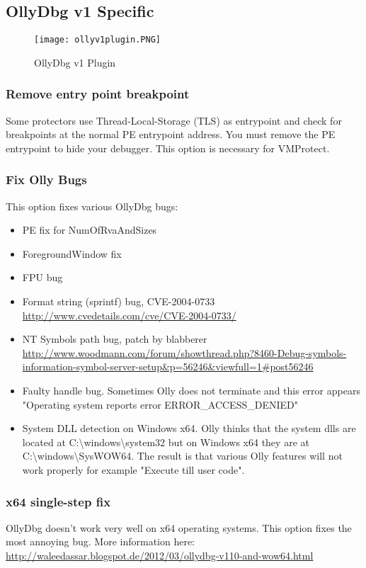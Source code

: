 \documentclass[10pt,a4paper]{article}
\begin{document}
\subsection{OllyDbg v1 Specific}

\begin{figure}[H]
\centering
\texttt{[image: ollyv1plugin.PNG]}
\caption{OllyDbg v1 Plugin}
\end{figure}

\subsubsection{Remove entry point breakpoint}
Some protectors use Thread-Local-Storage (TLS) as entrypoint and check for breakpoints at the normal PE entrypoint address. You must remove the PE entrypoint to hide your debugger. This option is necessary for VMProtect.

\pagebreak

\subsubsection{Fix Olly Bugs}
This option fixes various OllyDbg bugs: 
\begin{itemize}
\item PE fix for NumOfRvaAndSizes
\item ForegroundWindow fix
\item FPU bug
\item Format string (sprintf) bug, CVE-2004-0733 \url{http://www.cvedetails.com/cve/CVE-2004-0733/}
\item NT Symbols path bug, patch by blabberer \url{http://www.woodmann.com/forum/showthread.php?8460-Debug-symbols-information-symbol-server-setup&p=56246&viewfull=1#post56246}
\item Faulty handle bug. Sometimes Olly does not terminate and this error appears "Operating system reports error ERROR\_ACCESS\_DENIED"
\item System DLL detection on Windows x64. Olly thinks that the system dlls are located at C:\textbackslash{}windows\textbackslash{}system32 but on Windows x64 they are at C:\textbackslash{}windows\textbackslash{}SysWOW64. The result is that various Olly features will not work properly for example "Execute till user code".
\end{itemize}

\subsubsection{x64 single-step fix}
OllyDbg doesn't work very well on x64 operating systems. This option fixes the most annoying bug. More information here: \url{http://waleedassar.blogspot.de/2012/03/ollydbg-v110-and-wow64.html}
\end{document}
